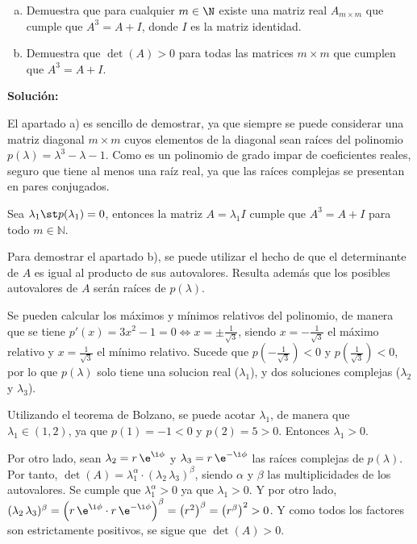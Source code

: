 \documentclass[../../main.tex]{subfiles}
\begin{document}
  \begin{shaded}
    \begin{enumerate}[a)]
      \item Demuestra que para cualquier $m \in \N$ existe una matriz real $A_{m \times m}$ que cumple que $A^3 = A + I$, donde $I$ es la matriz identidad.
      \item Demuestra que $\det{(A)} > 0$ para todas las matrices $m \times m$ que cumplen que $A^3 = A + I$.
    \end{enumerate}
  \end{shaded}

  \textbf{Solución:}

  El apartado a) es sencillo de demostrar, ya que siempre se puede considerar una matriz diagonal $m \times m$ cuyos elementos de la diagonal sean raíces del polinomio $p(\lambda) = \lambda^3 - \lambda - 1$. Como es un polinomio de grado impar de coeficientes reales, seguro que tiene al menos una raíz real, ya que las raíces complejas se presentan en pares conjugados.

  Sea $\lambda_1 \st p(\lambda_1) = 0$, entonces la matriz $A = \lambda_1 I$ cumple que $A^3 = A + I$ para todo $m \in \mathbb{N}$.

  Para demostrar el apartado b), se puede utilizar el hecho de que el determinante de $A$ es igual al producto de sus autovalores. Resulta además que los posibles autovalores de $A$ serán raíces de $p(\lambda)$.

  Se pueden calcular los máximos y mínimos relativos del polinomio, de manera que se tiene $p'(x) = 3x^2 - 1 = 0 \iff x = \pm \displaystyle\frac{1}{\sqrt{3}}$, siendo $x = -\displaystyle\frac{1}{\sqrt{3}}$ el máximo relativo y $x = \displaystyle\frac{1}{\sqrt{3}}$ el mínimo relativo. Sucede que $p\left(-\displaystyle\frac{1}{\sqrt{3}}\right) < 0$ y $p\left(\displaystyle\frac{1}{\sqrt{3}}\right) < 0$, por lo que $p(\lambda)$ solo tiene una solucion real ($\lambda_1$), y dos soluciones complejas ($\lambda_2$ y $\lambda_3$).

  Utilizando el teorema de Bolzano, se puede acotar $\lambda_1$, de manera que $\lambda_1 \in (1, 2)$, ya que $p(1) = -1 < 0$ y $p(2) = 5 > 0$. Entonces $\lambda_1 > 0$.

  Por otro lado, sean $\lambda_2 = r \, \e^{\i\phi}$ y $\lambda_3 = r \, \e^{-\i\phi}$ las raíces complejas de $p(\lambda)$. Por tanto, $\det{(A)} = \lambda_1^\alpha \cdot (\lambda_2 \, \lambda_3)^\beta$, siendo $\alpha$ y $\beta$ las multiplicidades de los autovalores. Se cumple que $\lambda_1^\alpha > 0$ ya que $\lambda_1 > 0$. Y por otro lado, $(\lambda_2 \, \lambda_3)^\beta = \left(r \, \e^{\i\phi} \cdot r \, \e^{-\i\phi} \right)^\beta = \left(r^2\right)^\beta = \left(r^\beta\right)^2 > 0$. Y como todos los factores son estrictamente positivos, se sigue que $\det{(A)} > 0$.
\end{document}

